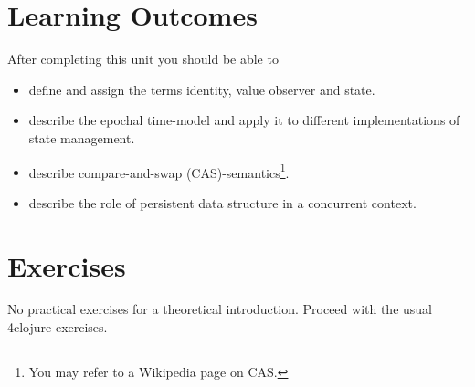 \documentclass[11pt,a4paper]{article}
\begin{document}
\section{Learning Outcomes}

After completing this unit you should be able to

\begin{itemize}
	\item define and assign the terms identity, value observer and state.
    \item describe the epochal time-model and apply it to different implementations of state management.
    \item describe compare-and-swap (CAS)-semantics\footnote{You may refer to a Wikipedia page on CAS.}.
    \item describe the role of persistent data structure in a concurrent context.
\end{itemize}


\section{Exercises}

No practical exercises for a theoretical introduction.
Proceed with the usual 4clojure exercises.
\end{document}

